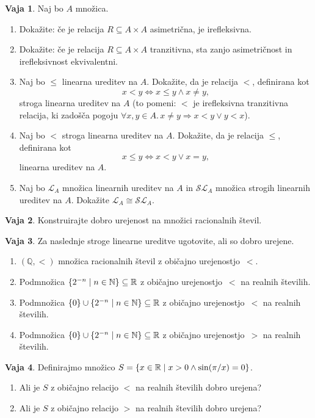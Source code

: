 \documentclass{article}
\newcommand{\all}[1]{\forall #1 .\,}
\newcommand{\lthen}{\Rightarrow}
\newcommand{\NN}{\mathbb{N}}
\newcommand{\QQ}{\mathbb{Q}}
\newcommand{\RR}{\mathbb{R}}
\theoremstyle{definition}
\newtheorem{vaja}{Vaja}
\begin{document}
\begin{vaja}
  Naj bo $A$ množica.
  \begin{enumerate}
    \item
      Dokažite: če je relacija $R \subseteq A \times A$ asimetrična, je irefleksivna.
    \item
      Dokažite: če je relacija $R \subseteq A \times A$ tranzitivna, sta zanjo asimetričnost in irefleksivnost ekvivalentni.
    \item
      Naj bo $\leq$ linearna ureditev na $A$. Dokažite, da je relacija $<$, definirana kot
      \[x < y \iff x \leq y \land x \neq y,\]
      stroga linearna ureditev na $A$ (to pomeni: $<$ je irefleksivna tranzitivna relacija, ki zadošča pogoju $\all{x, y \in A}{x \neq y \lthen x < y \lor y < x}$).
    \item
      Naj bo $<$ stroga linearna ureditev na $A$. Dokažite, da je relacija $\leq$, definirana kot
      \[x \leq y \iff x < y \lor x = y,\]
      linearna ureditev na $A$.
    \item
      Naj bo $\mathcal{L}_A$ množica linearnih ureditev na $A$ in $\mathcal{SL}_A$ množica strogih linearnih ureditev na $A$. Dokažite $\mathcal{L}_A \cong \mathcal{SL}_A$.
  \end{enumerate}
\end{vaja}

\begin{vaja}
  Konstruirajte dobro urejenost na množici racionalnih števil.
\end{vaja}

\begin{vaja}
  Za naslednje stroge linearne ureditve ugotovite, ali so dobro urejene.
  \begin{enumerate}
    \item
      $(\QQ, <)$ množica racionalnih števil z običajno urejenostjo~$<$.
    \item
      Podmnožica $\set{2^{-n}}{n \in \NN} \subseteq \RR$ z običajno urejenostjo~$<$ na realnih številih.
    \item
      Podmnožica $\set{0} \cup \set{2^{-n}}{n \in \NN} \subseteq \RR$ z običajno urejenostjo~$<$ na realnih številih.
    \item
      Podmnožica $\set{0} \cup \set{2^{-n}}{n \in \NN} \subseteq \RR$ z običajno urejenostjo~$>$ na realnih številih.
  \end{enumerate}
\end{vaja}

\begin{vaja}
  Definirajmo množico $S = \set{x \in \RR}{x > 0 \land \sin(\pi/x) = 0}$.
  \begin{enumerate}
    \item Ali je $S$ z običajno relacijo $<$ na realnih številih dobro urejena?
    \item Ali je $S$ z običajno relacijo $>$ na realnih številih dobro urejena?
  \end{enumerate}
\end{vaja}
\end{document}
